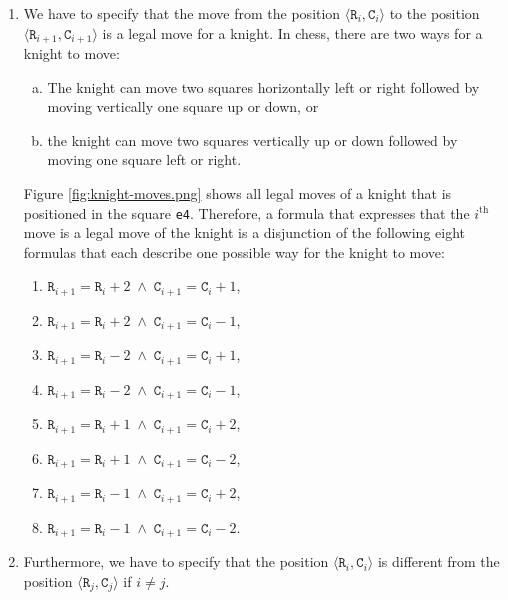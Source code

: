 \begin{enumerate}
\item We have to specify that the move from the position $\langle \mathtt{R}_i, \mathtt{C}_i \rangle$
      to the position $\langle \mathtt{R}_{i+1}, \mathtt{C}_{i+1} \rangle$ is a legal move for a knight.
      In chess, there are two ways for a knight to move:
      \begin{enumerate}[(a)]
      \item The knight can move two squares horizontally left or right followed by moving vertically
            one square up or down, or
      \item the knight can move two squares vertically up or down followed by moving
            one square left or right.
      \end{enumerate}
      Figure \ref{fig:knight-moves.png} shows all legal moves of a knight that is positioned in the square \texttt{e4}.
      Therefore, a formula that expresses that the $i^{\mathrm{th}}$ move is a legal move of the knight is a disjunction
      of the following eight formulas that each describe one possible way for the knight to move:
      \begin{enumerate}
      \item $\mathtt{R}_{i+1} = \mathtt{R}_{i} + 2 \;\wedge\; \mathtt{C}_{i+1} = \mathtt{C}_{i} + 1$,
      \item $\mathtt{R}_{i+1} = \mathtt{R}_{i} + 2 \;\wedge\; \mathtt{C}_{i+1} = \mathtt{C}_{i} - 1$, 
      \item $\mathtt{R}_{i+1} = \mathtt{R}_{i} - 2 \;\wedge\; \mathtt{C}_{i+1} = \mathtt{C}_{i} + 1$, 
      \item $\mathtt{R}_{i+1} = \mathtt{R}_{i} - 2 \;\wedge\; \mathtt{C}_{i+1} = \mathtt{C}_{i} - 1$, 
      \item $\mathtt{R}_{i+1} = \mathtt{R}_{i} + 1 \;\wedge\; \mathtt{C}_{i+1} = \mathtt{C}_{i} + 2$, 
      \item $\mathtt{R}_{i+1} = \mathtt{R}_{i} + 1 \;\wedge\; \mathtt{C}_{i+1} = \mathtt{C}_{i} - 2$, 
      \item $\mathtt{R}_{i+1} = \mathtt{R}_{i} - 1 \;\wedge\; \mathtt{C}_{i+1} = \mathtt{C}_{i} + 2$, 
      \item $\mathtt{R}_{i+1} = \mathtt{R}_{i} - 1 \;\wedge\; \mathtt{C}_{i+1} = \mathtt{C}_{i} - 2$. 
      \end{enumerate}
\item Furthermore, we have to specify that the position  $\langle \mathtt{R}_i, \mathtt{C}_i \rangle$ is
      different from the position  $\langle \mathtt{R}_j, \mathtt{C}_j \rangle$ if $i \not= j$.
\end{enumerate}


